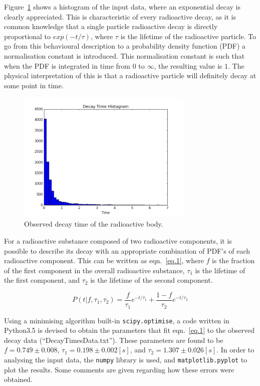 \documentclass[a4paper,12pt]{article}
\begin{document}
Figure~\ref{fig.1} shows a histogram of the input data, where an exponential decay is clearly appreciated. This is characteristic of every radioactive decay, as it is common knowledge that a single particle radioactive decay is directly proportional to $exp(-t/\tau)$, where $\tau$ is the lifetime of the radioactive particle. To go from this behavioural description to a probability density function (PDF) a normalisation constant is introduced. This normalisation constant is such that when the PDF is integrated in time from $0$ to $\infty$, the resulting value is $1$. The physical interpretation of this is that a radioactive particle will definitely decay at some point in time. 

\begin{figure}[h!]
\centering
\includegraphics[width=0.75\textwidth]{img/observed_time}
\caption{Observed decay time of the radioactive body.}
\label{fig.1}
\end{figure}

For a radioactive substance composed of two radioactive components, it is possible to describe its decay with an appropriate combination of PDF's of each radioactive component. This can be written as eqn.~\ref{eq.1}, where $f$ is the fraction of the first component in the overall radioactive substance, $\tau_1$ is the lifetime of the first component, and $\tau_2$ is the lifetime of the second component. 

\begin{equation}
 P(t \vert f, \tau_1, \tau_2) = \frac{f}{\tau_1} e^{-t / \tau_1} + \frac{1-f}{\tau_2} e^{-t / \tau_2}
 \label{eq.1}
\end{equation}

Using a minimising algorithm built-in \texttt{scipy.optimise}, a code written in Python3.5 is devised to obtain the parameters that fit eqn.~\ref{eq.1} to the observed decay data (``DecayTimesData.txt''). These parameters are found to be  $f=0.749 \pm 0.008$, $\tau_1=0.198 \pm 0.002 [s]$, and $\tau_2=1.307 \pm 0.026 [s]$. In order to analysing the input data, the \texttt{numpy} library is used, and \texttt{matplotlib.pyplot} to plot the results. Some comments are given regarding how these errors were obtained. 
\end{document}
